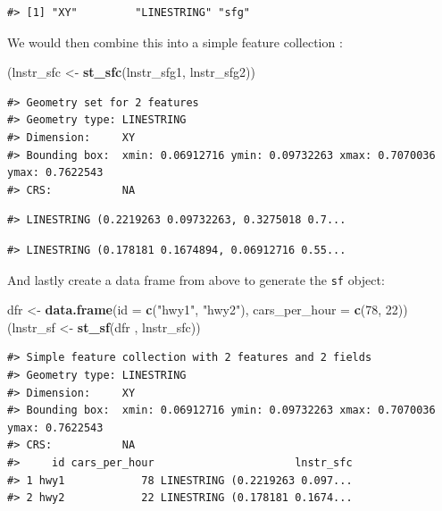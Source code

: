 \documentclass[
]{book}
\newenvironment{Shaded}{\begin{snugshade}}{\end{snugshade}}
\newcommand{\AttributeTok}[1]{\textcolor[rgb]{0.13,0.29,0.53}{#1}}
\newcommand{\DecValTok}[1]{\textcolor[rgb]{0.00,0.00,0.81}{#1}}
\newcommand{\FunctionTok}[1]{\textcolor[rgb]{0.13,0.29,0.53}{\textbf{#1}}}
\newcommand{\NormalTok}[1]{#1}
\newcommand{\OtherTok}[1]{\textcolor[rgb]{0.56,0.35,0.01}{#1}}
\newcommand{\StringTok}[1]{\textcolor[rgb]{0.31,0.60,0.02}{#1}}
\begin{document}
\begin{verbatim}
#> [1] "XY"         "LINESTRING" "sfg"
\end{verbatim}

We would then combine this into a simple feature collection :

\begin{Shaded}
\begin{Highlighting}[]
\NormalTok{(lnstr\_sfc }\OtherTok{\textless{}{-}} \FunctionTok{st\_sfc}\NormalTok{(lnstr\_sfg1, lnstr\_sfg2)) }
\end{Highlighting}
\end{Shaded}

\begin{verbatim}
#> Geometry set for 2 features 
#> Geometry type: LINESTRING
#> Dimension:     XY
#> Bounding box:  xmin: 0.06912716 ymin: 0.09732263 xmax: 0.7070036 ymax: 0.7622543
#> CRS:           NA
\end{verbatim}

\begin{verbatim}
#> LINESTRING (0.2219263 0.09732263, 0.3275018 0.7...
\end{verbatim}

\begin{verbatim}
#> LINESTRING (0.178181 0.1674894, 0.06912716 0.55...
\end{verbatim}

And lastly create a data frame from above to generate the \texttt{sf} object:

\begin{Shaded}
\begin{Highlighting}[]
\NormalTok{dfr }\OtherTok{\textless{}{-}} \FunctionTok{data.frame}\NormalTok{(}\AttributeTok{id =} \FunctionTok{c}\NormalTok{(}\StringTok{"hwy1"}\NormalTok{, }\StringTok{"hwy2"}\NormalTok{), }
                  \AttributeTok{cars\_per\_hour =} \FunctionTok{c}\NormalTok{(}\DecValTok{78}\NormalTok{, }\DecValTok{22}\NormalTok{))}
\NormalTok{(lnstr\_sf }\OtherTok{\textless{}{-}} \FunctionTok{st\_sf}\NormalTok{(dfr , lnstr\_sfc))}
\end{Highlighting}
\end{Shaded}

\begin{verbatim}
#> Simple feature collection with 2 features and 2 fields
#> Geometry type: LINESTRING
#> Dimension:     XY
#> Bounding box:  xmin: 0.06912716 ymin: 0.09732263 xmax: 0.7070036 ymax: 0.7622543
#> CRS:           NA
#>     id cars_per_hour                      lnstr_sfc
#> 1 hwy1            78 LINESTRING (0.2219263 0.097...
#> 2 hwy2            22 LINESTRING (0.178181 0.1674...
\end{verbatim}
\end{document}
